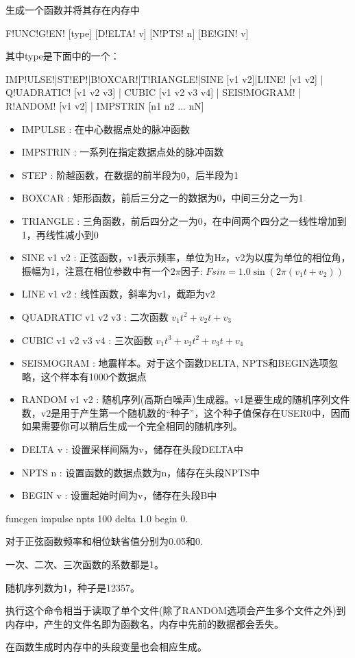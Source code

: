 \label{cmd:funcgen}

生成一个函数并将其存在内存中

\begin{SACSTX}
F!UNC!G!EN! [type] [D!ELTA! v] [N!PTS! n] [BE!GIN! v]
\end{SACSTX}
其中type是下面中的一个：
\begin{SACSTX}
IMP!ULSE!|ST!EP!|B!OXCAR!|T!RIANGLE!|SINE [v1 v2]|L!INE! [v1 v2] |
Q!UADRATIC! [v1 v2 v3] | CUBIC [v1 v2 v3 v4] | SEIS!MOGRAM! | R!ANDOM! [v1 v2] |
IMPSTRIN  [n1 n2 ... nN]
\end{SACSTX}

\begin{itemize}
\item IMPULSE : 在中心数据点处的脉冲函数 
\item IMPSTRIN : 一系列在指定数据点处的脉冲函数  
\item STEP :  阶越函数，在数据的前半段为0，后半段为1 
\item BOXCAR : 矩形函数，前后三分之一的数据为0，中间三分之一为1 
\item TRIANGLE : 三角函数，前后四分之一为0，在中间两个四分之一线性增加到1，再线性减小到0 
\item SINE v1 v2 : 正弦函数，v1表示频率，单位为Hz，v2为以度为单位的相位角，振幅为1，注意在相位参数中有一个$2\pi$因子: $ Fsin = 1.0 \sin (2\pi (v_1t+v_2))$ 
\item LINE v1 v2 : 线性函数，斜率为v1，截距为v2 
\item QUADRATIC v1 v2 v3 : 二次函数 $v_1 t^{2} + v_2 t + v_3 $
\item CUBIC v1 v2 v3 v4 : 三次函数 $ v_1 t^{3} + v_2 t^2 + v_3t + v_4 $
\item SEISMOGRAM : 地震样本。对于这个函数DELTA, NPTS和BEGIN选项忽略，这个样本有1000个数据点 
\item RANDOM v1 v2 :  随机序列(高斯白噪声)生成器。v1是要生成的随机序列文件数，v2是用于产生第一个随机数的``种子''，这个种子值保存在USER0中，因而如果需要你可以稍后生成一个完全相同的随机序列。 
\item DELTA v : 设置采样间隔为v，储存在头段DELTA中 
\item NPTS n : 设置函数的数据点数为n，储存在头段NPTS中 
\item BEGIN v : 设置起始时间为v，储存在头段B中 
\end{itemize}

\begin{SACDFT}
funcgen impulse npts 100 delta 1.0 begin 0.
\end{SACDFT}

对于正弦函数频率和相位缺省值分别为0.05和0.

一次、二次、三次函数的系数都是1。

随机序列数为1，种子是12357。

执行这个命令相当于读取了单个文件(除了RANDOM选项会产生多个文件之外)到内存中，产生的文件名即为函数名，内存中先前的数据都会丢失。

在函数生成时内存中的头段变量也会相应生成。


